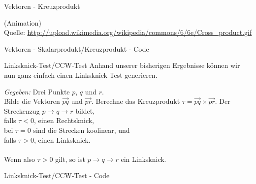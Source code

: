 \begin{frame}{Vektoren - Kreuzprodukt}
	\begin{center}
		(Animation)\\
		Quelle:	\url{http://upload.wikimedia.org/wikipedia/commons/6/6e/Cross_product.gif}
	\end{center}
\end{frame}

\begin{frame}{Vektoren - Skalarprodukt/Kreuzprodukt - Code}
	\lstset{
		language=C++,
		tabsize=1
	}
	
\end{frame}

\begin{frame}{Linksknick-Test/CCW-Test}
	Anhand unserer bisherigen Ergebnisse können wir nun ganz einfach einen Linksknick-Test generieren.
	
	\begin{exampleblock}{}
		\textit{Gegeben:} Drei Punkte $p$, $q$ und $r$.\\
		Bilde die Vektoren $\overrightarrow{pq}$ und $\overrightarrow{pr}$. Berechne das Kreuzprodukt $\tau = \overrightarrow{pq} \times \overrightarrow{pr}$. Der Streckenzug $p \rightarrow q \rightarrow r$ bildet,\\
		falls $\tau < 0$, einen Rechtsknick,\\
		bei $\tau = 0$ sind die Strecken koolinear, und\\
		falls $\tau > 0$, einen Linksknick.\\ \ \\
		
		Wenn also $\tau > 0$ gilt, so ist $p \rightarrow q \rightarrow r$ ein Linksknick.
	\end{exampleblock}
\end{frame}

\begin{frame}{Linksknick-Test/CCW-Test - Code}
	\lstset{
		language=C++,
		tabsize=1
	}
	
\end{frame}

